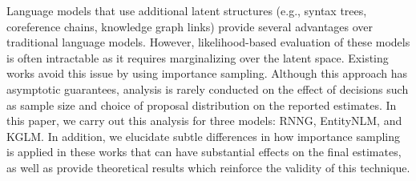 Language models that use additional latent structures (e.g., syntax trees, coreference chains, knowledge graph links) provide several advantages over traditional language models. However, likelihood-based evaluation of these models is often intractable as it requires marginalizing over the latent space. Existing works avoid this issue by using importance sampling. Although this approach has asymptotic guarantees, analysis is rarely conducted on the effect of decisions such as sample size and choice of proposal distribution on the reported estimates. In this paper, we carry out this analysis for three models: RNNG, EntityNLM, and KGLM. In addition, we elucidate subtle differences in how importance sampling is applied in these works that can have substantial effects on the final estimates, as well as provide theoretical results which reinforce the validity of this technique.

